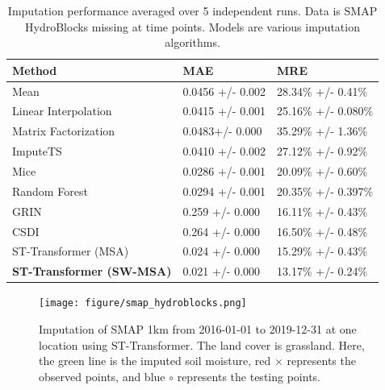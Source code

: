 \documentclass[11pt]{article}
\begin{document}
\begin{table}[h!]
    \centering
    \begin{tabularx}{\textwidth}{lXX}
        \toprule
       Method & MAE & MRE \\
        \midrule
        Mean & 0.0456 +/- 0.002& 28.34\% +/- 0.41\%  \\
        Linear Interpolation & 0.0415 +/- 0.001 & 25.16\% +/- 0.080\%\\
        Matrix Factorization & 0.0483+/- 0.000 & 35.29\% +/- 1.36\% \\
        ImputeTS & 0.0410 +/- 0.002 & 27.12\% +/- 0.92\% \\
        Mice & 0.0286 +/- 0.001& 20.09\% +/- 0.60\% \\
        Random Forest &  0.0294 +/- 0.001&  20.35\% +/- 0.397\%\\
   		GRIN &0.259 +/- 0.000 & 16.11\% +/- 0.43\%\\
        CSDI & 0.264 +/- 0.000 & 16.50\% +/- 0.48\%\\
        ST-Transformer (MSA) & 0.024 +/- 0.000 & 15.29\% +/- 0.43\%\\
        \textbf{ST-Transformer (SW-MSA)} & 0.021 +/- 0.000 & 13.17\% +/- 0.24\%\\
        
        \bottomrule

        
    \end{tabularx}
    \caption{Imputation performance averaged over 5 independent runs. Data is SMAP HydroBlocks missing at time points. Models are various imputation algorithms.}
    \label{tab: smap_hydroblock}
\end{table}


 
\begin{figure}[H]
\centering
\texttt{[image: figure/smap\_hydroblocks.png]}
\caption{Imputation of SMAP 1km from 2016-01-01 to 2019-12-31 at one location using ST-Transformer. The land cover is grassland. Here, the green line is the imputed soil moisture, red $\times$ represents the observed points, and blue $\circ$ represents the testing points.}
\label{fig: smap_hydroblock}
\end{figure}
 
 
 
\end{document}
